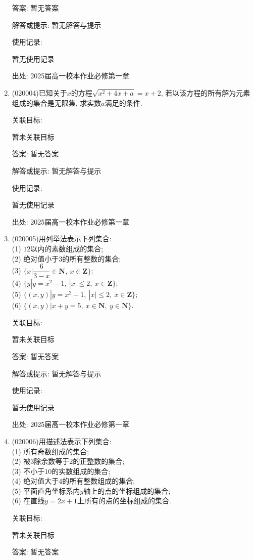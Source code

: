\documentclass[10pt,a4paper]{article}
\begin{document}
\begin{enumerate}[1.]
答案: 暂无答案

解答或提示: 暂无解答与提示

使用记录:

暂无使用记录


出处: 2025届高一校本作业必修第一章
\item { (020004)}已知关于$x$的方程$\sqrt {x^2+4x+a}=x+2$, 若以该方程的所有解为元素组成的集合是无限集, 求实数$a$满足的条件.


关联目标:

暂未关联目标

答案: 暂无答案

解答或提示: 暂无解答与提示

使用记录:

暂无使用记录


出处: 2025届高一校本作业必修第一章
\item { (020005)}用列举法表示下列集合:\\
(1) $12$以内的素数组成的集合;\\
(2) 绝对值小于$3$的所有整数的集合;\\
(3) $\{x|\dfrac 6{3-x}\in\mathbf{N}, \ x\in\mathbf{Z}\}$;\\
(4) $\{y|y=x^2-1 , \ |x| \le 2, \ x\in\mathbf{Z}\}$;\\
(5) $\{( x,y)|y=x^2-1,\ |x|\le 2, \ x\in\mathbf{Z}\}$;\\
(6) $\{( x,y)|x +y=5, \ x\in\mathbf{N}, \ y\in\mathbf{N}\}$.


关联目标:

暂未关联目标

答案: 暂无答案

解答或提示: 暂无解答与提示

使用记录:

暂无使用记录


出处: 2025届高一校本作业必修第一章
\item { (020006)}用描述法表示下列集合:\\
(1) 所有奇数组成的集合;\\
(2) 被$3$除余数等于$2$的正整数的集合;\\
(3) 不小于$10$的实数组成的集合;\\
(4) 绝对值大于$4$的所有整数组成的集合;\\
(5) 平面直角坐标系内$y$轴上的点的坐标组成的集合;\\
(6) 在直线$y=2x+1$上所有的点的坐标组成的集合.


关联目标:

暂未关联目标

答案: 暂无答案


\end{enumerate}
\end{document}
